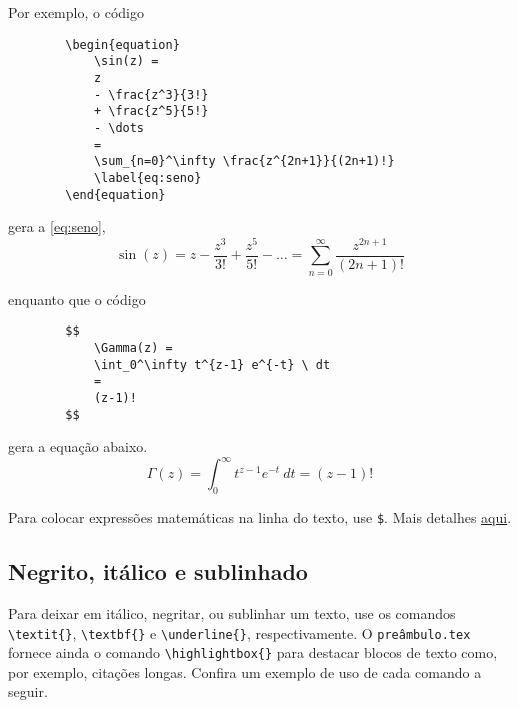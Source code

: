         Por exemplo, o código
        \begin{verbatim}
        \begin{equation}
            \sin(z) = 
            z 
            - \frac{z^3}{3!} 
            + \frac{z^5}{5!}
            - \dots
            = 
            \sum_{n=0}^\infty \frac{z^{2n+1}}{(2n+1)!}
            \label{eq:seno}
        \end{equation}
        \end{verbatim}

        gera a \autoref{eq:seno},
        \begin{equation}
            \sin(z) = 
            z 
            - \frac{z^3}{3!} 
            + \frac{z^5}{5!}
            - \dots
            = 
            \sum_{n=0}^\infty \frac{z^{2n+1}}{(2n+1)!}
            \label{eq:seno}
        \end{equation}

        enquanto que o código 
        \begin{verbatim}
        $$ 
            \Gamma(z) =
            \int_0^\infty t^{z-1} e^{-t} \ dt
            =
            (z-1)!
        $$
        \end{verbatim}

        gera a equação abaixo.
        $$ 
            \Gamma(z) =
            \int_0^\infty t^{z-1} e^{-t} \ dt
            =
            (z-1)!
        $$

        Para colocar expressões matemáticas na linha do texto, use \verb|$|. 
        Mais detalhes \href{https://www.overleaf.com/learn/latex/Mathematical_expressions}{aqui}.

    \subsection{Negrito, itálico e sublinhado}
        Para deixar em itálico, negritar, ou sublinhar um texto, use os comandos
        \verb|\textit{}|, \verb|\textbf{}| e \verb|\underline{}|, respectivamente. 
        O {\tt preâmbulo.tex} fornece ainda o comando \verb|\highlightbox{}| para destacar blocos de texto como, por exemplo, citações longas.
        Confira um exemplo de uso de cada comando a  seguir.\\



